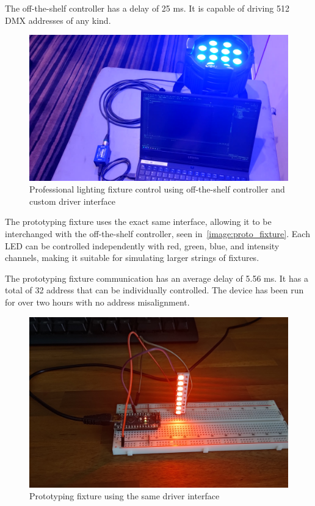 The off-the-shelf controller has a delay of 25 ms.
It is capable of driving 512 DMX addresses of any kind.

\begin{figure}[h]
\caption{Professional lighting fixture control using off-the-shelf controller and custom driver interface}\label{image:prof_fixture}
\centering\includegraphics[width=\textwidth]{chapters/development/off_the_shelf_controller}
\end{figure}

The prototyping fixture uses the exact same interface, allowing it to be interchanged with the off-the-shelf controller,
seen in~\autoref{image:proto_fixture}.
Each LED can be controlled independently with red, green, blue, and intensity channels,
making it suitable for simulating larger strings of fixtures.

The prototyping fixture communication has an average delay of 5.56 ms.
It has a total of 32 address that can be individually controlled.
The device has been run for over two hours with no address misalignment.

\begin{figure}[h]
\caption{Prototyping fixture using the same driver interface}\label{image:proto_fixture}
\centering\includegraphics[width=\textwidth]{chapters/development/prototyping_fixture_cropped}
\end{figure}


